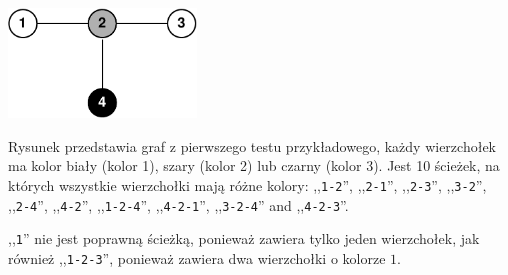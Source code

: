 \section*{}

\includegraphics[width=5cm]{pathsfig.pdf}

Rysunek przedstawia graf z pierwszego testu przykładowego, każdy wierzchołek ma kolor biały (kolor 1), szary (kolor 2) lub czarny (kolor 3).
Jest 10 ścieżek, na których wszystkie wierzchołki mają różne kolory:
,,\texttt{1-2}'', ,,\texttt{2-1}'', ,,\texttt{2-3}'', ,,\texttt{3-2}'', ,,\texttt{2-4}'', ,,\texttt{4-2}'', ,,\texttt{1-2-4}'', ,,\texttt{4-2-1}'', ,,\texttt{3-2-4}'' and ,,\texttt{4-2-3}''.

,,\texttt{1}'' nie jest poprawną ścieżką, ponieważ zawiera tylko jeden wierzchołek, jak również
,,\texttt{1-2-3}'', ponieważ zawiera dwa wierzchołki o kolorze $1$.
